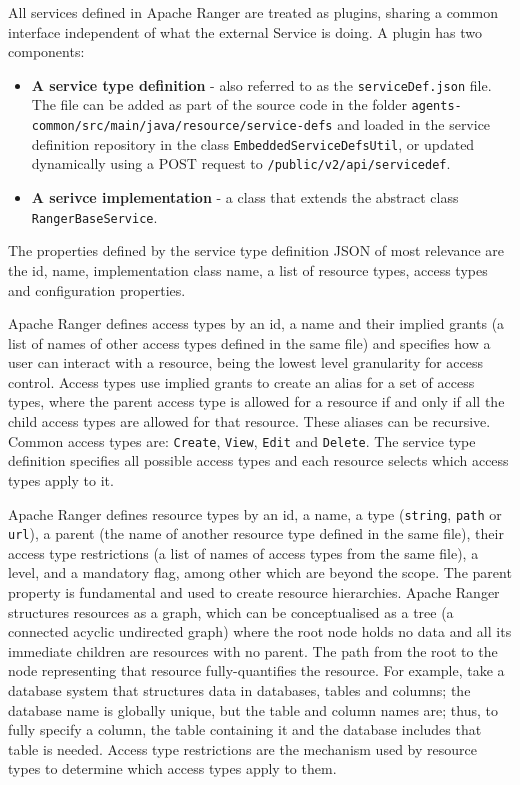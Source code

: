 All services defined in Apache Ranger are treated as plugins, sharing a common interface independent of what the external Service is doing. A plugin has two components:

\begin{itemize}
    \item \textbf{A service type definition} - also referred to as the \texttt{serviceDef.json} file. The file can be added as part of the source code in the folder \texttt{agents-common/src/main/java/resource/service-defs} and loaded in the service definition repository in the class \texttt{EmbeddedServiceDefsUtil}, or updated dynamically using a POST request to \texttt{/public/v2/api/servicedef}.
    \item \textbf{A serivce implementation} - a class that extends the abstract class \texttt{RangerBaseService}.
\end{itemize}

The properties defined by the service type definition JSON of most relevance are the id, name, implementation class name, a list of resource types, access types and configuration properties.

Apache Ranger defines access types by an id, a name and their implied grants (a list of names of other access types defined in the same file) and specifies how a user can interact with a resource, being the lowest level granularity for access control. Access types use implied grants to create an alias for a set of access types, where the parent access type is allowed for a resource if and only if all the child access types are allowed for that resource. These aliases can be recursive. Common access types are: \texttt{Create}, \texttt{View}, \texttt{Edit} and \texttt{Delete}. The service type definition specifies all possible access types and each resource selects which access types apply to it.

Apache Ranger defines resource types by an id, a name, a type (\texttt{string}, \texttt{path} or \texttt{url}), a parent (the name of another resource type defined in the same file), their access type restrictions (a list of names of access types from the same file), a level, and a mandatory flag, among other which are beyond the scope. The parent property is fundamental and used to create resource hierarchies. Apache Ranger structures resources as a graph, which can be conceptualised as a tree (a connected acyclic undirected graph) where the root node holds no data and all its immediate children are resources with no parent. The path from the root to the node representing that resource fully-quantifies the resource. For example, take a database system that structures data in databases, tables and columns; the database name is globally unique, but the table and column names are; thus, to fully specify a column, the table containing it and the database includes that table is needed. Access type restrictions are the mechanism used by resource types to determine which access types apply to them.

